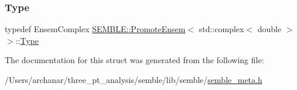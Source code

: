 \mbox{\label{structSEMBLE_1_1PromoteEnsem_3_01std_1_1complex_3_01double_01_4_01_4_a86cb6b2c8e60fc197b97aceb98bfe2be}} 
\subsubsection{\texorpdfstring{Type}{Type}\hspace{0.1cm}{\footnotesize\ttfamily [2/2]}}
{\footnotesize\ttfamily typedef Ensem\+Complex \mbox{\hyperlink{structSEMBLE_1_1PromoteEnsem}{S\+E\+M\+B\+L\+E\+::\+Promote\+Ensem}}$<$ std\+::complex$<$ double $>$ $>$\+::\mbox{\hyperlink{structSEMBLE_1_1PromoteEnsem_3_01std_1_1complex_3_01double_01_4_01_4_a86cb6b2c8e60fc197b97aceb98bfe2be}{Type}}}



The documentation for this struct was generated from the following file\+:\begin{DoxyCompactItemize}
\item 
/\+Users/archanar/three\+\_\+pt\+\_\+analysis/semble/lib/semble/\mbox{\hyperlink{lib_2semble_2semble__meta_8h}{semble\+\_\+meta.\+h}}\end{DoxyCompactItemize}
